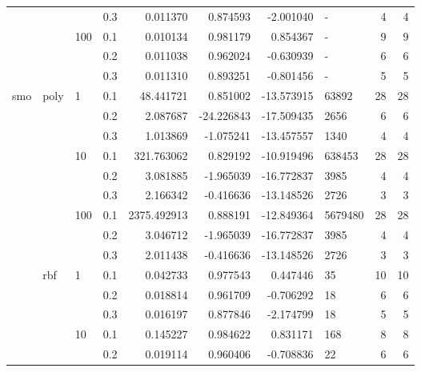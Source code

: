 \begin{table}[h!]
\begin{tabular}{llllrrrlrr}
       &     &     & 0.3 &     0.011370 &   0.874593 &  -2.001040 &         - &           4 &         4 \\
       &     & 100 & 0.1 &     0.010134 &   0.981179 &   0.854367 &         - &           9 &         9 \\
       &     &     & 0.2 &     0.011038 &   0.962024 &  -0.630939 &         - &           6 &         6 \\
       &     &     & 0.3 &     0.011310 &   0.893251 &  -0.801456 &         - &           5 &         5 \\
smo & poly & 1   & 0.1 &    48.441721 &   0.851002 & -13.573915 &     63892 &          28 &        28 \\
       &     &     & 0.2 &     2.087687 & -24.226843 & -17.509435 &      2656 &           6 &         6 \\
       &     &     & 0.3 &     1.013869 &  -1.075241 & -13.457557 &      1340 &           4 &         4 \\
       &     & 10  & 0.1 &   321.763062 &   0.829192 & -10.919496 &    638453 &          28 &        28 \\
       &     &     & 0.2 &     3.081885 &  -1.965039 & -16.772837 &      3985 &           4 &         4 \\
       &     &     & 0.3 &     2.166342 &  -0.416636 & -13.148526 &      2726 &           3 &         3 \\
       &     & 100 & 0.1 &  2375.492913 &   0.888191 & -12.849364 &   5679480 &          28 &        28 \\
       &     &     & 0.2 &     3.046712 &  -1.965039 & -16.772837 &      3985 &           4 &         4 \\
       &     &     & 0.3 &     2.011438 &  -0.416636 & -13.148526 &      2726 &           3 &         3 \\
       & rbf & 1   & 0.1 &     0.042733 &   0.977543 &   0.447446 &        35 &          10 &        10 \\
       &     &     & 0.2 &     0.018814 &   0.961709 &  -0.706292 &        18 &           6 &         6 \\
       &     &     & 0.3 &     0.016197 &   0.877846 &  -2.174799 &        18 &           5 &         5 \\
       &     & 10  & 0.1 &     0.145227 &   0.984622 &   0.831171 &       168 &           8 &         8 \\
       &     &     & 0.2 &     0.019114 &   0.960406 &  -0.708836 &        22 &           6 &         6 \\

\end{tabular}
\end{table}
